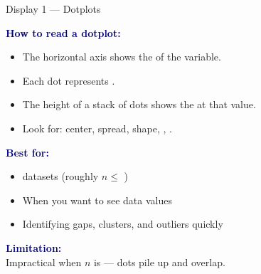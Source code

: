 \documentclass[10pt]{article}
\begin{document}
\vspace{0.1in}

\begin{notesbox}{Display 1 --- Dotplots}
\small
\begin{multicols}{2}

\textbf{\textcolor{navy}{How to read a dotplot:}}
\begin{itemize}[itemsep=3pt]
  \item The horizontal axis shows the \blank{2.5cm} of the variable.
  \item Each dot represents \blank{2cm}.
  \item The height of a stack of dots shows the \blank{2.2cm} at that value.
  \item Look for: center, spread, shape, \blank{2cm}, \blank{2cm}.
\end{itemize}

\columnbreak

\textbf{\textcolor{navy}{Best for:}}
\begin{itemize}[itemsep=3pt]
  \item \blank{1.5cm} datasets (roughly $n \le $ \blank{0.9cm})
  \item When you want to see \blank{2.5cm} data values
  \item Identifying gaps, clusters, and outliers quickly
\end{itemize}

\vspace{6pt}
\textbf{\textcolor{navy}{Limitation:}}\\
Impractical when $n$ is \blank{2cm} --- dots pile up and overlap.

\end{multicols}
\end{notesbox}

\vspace{0.1in}
\end{document}
